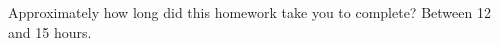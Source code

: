 \documentclass[submit]{harvardml}
\begin{document}
	
	
	
	
	
	\newpage
	\begin{problem}[Calibration, 1pt]
		Approximately how long did this homework take you to complete? Between 12 and 15 hours.  
	\end{problem}
	
	
\end{document}

